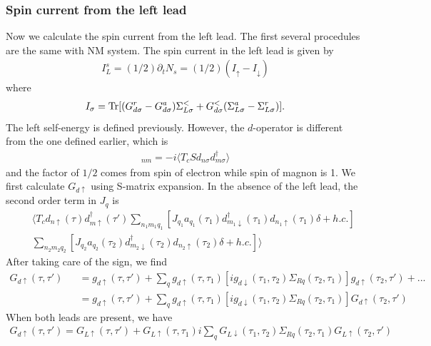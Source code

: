 \documentclass[aps,prb,superscriptaddress]{revtex4-2}
\begin{document}
\subsubsection{Spin current from the left lead}
Now we calculate the spin current from the left lead. The first several procedules are the same with NM system. The spin current in the left lead is given by
\begin{eqnarray}
I_L^s = (1/2) \partial_t N_s = (1/2)(I_{\uparrow}-I_{\downarrow}) \nonumber
\end{eqnarray}
where
\begin{eqnarray}
I_\sigma = {\rm Tr} [(G_{d\sigma}^r-G_{d\sigma}^a)\Sigma^<_{L\sigma} +G_{d\sigma}^< (\Sigma_{L\sigma}^a -\Sigma_{L\sigma}^r)]. \nonumber
\end{eqnarray}
The left self-energy is defined previously. However, the $d$-operator is different from the one defined earlier, which is
\begin{eqnarray}
[G_{d\sigma}]_{nm} = -i\langle T_c S d_{n\sigma} d^\dagger_{m\sigma}\rangle \nonumber
\end{eqnarray}
and the factor of $1/2$ comes from spin of electron while spin of magnon is 1. We first calculate $G_{d\uparrow}$ using S-matrix expansion. In the absence of the left lead, the second order term in $J_q$ is
\begin{eqnarray}
&&\langle T_c d_{n\uparrow}(\tau) d^{\dagger}_{m\uparrow}(\tau') \sum_{n_1 m_1 q_1}[J_{q_1} a_{q_1}(\tau_1) d^{\dagger}_{m_1\downarrow}(\tau_1) d_{n_1\uparrow}(\tau_1)\delta +h.c.]\nonumber \\
&&\sum_{n_2 m_2 q_2}[J_{q_2} a_{q_2}(\tau_2) d^{\dagger}_{m_2\downarrow}(\tau_2) d_{n_2\uparrow}(\tau_2)\delta +h.c.]\rangle \nonumber
\end{eqnarray}
After taking care of the sign, we find
\begin{eqnarray}
G_{d\uparrow}(\tau,\tau') &&= g_{d\uparrow}(\tau,\tau') + \sum_q  g_{d\uparrow}(\tau,\tau_1) [ig_{d\downarrow}(\tau_1,\tau_2)\Sigma_{Rq}(\tau_2,\tau_1)] g_{d\uparrow}(\tau_2,\tau') +... \nonumber \\
&&=g_{d\uparrow}(\tau,\tau') +\sum_q  g_{d\uparrow}(\tau,\tau_1) [ig_{d\downarrow}(\tau_1,\tau_2)\Sigma_{Rq}(\tau_2,\tau_1)] G_{d\uparrow}(\tau_2,\tau') \nonumber
\end{eqnarray}
When both leads are present, we have
\begin{eqnarray}
G_{d\uparrow}(\tau,\tau') =G_{L\uparrow}(\tau,\tau') + G_{L\uparrow}(\tau,\tau_1) i\sum_q G_{L\downarrow}(\tau_1,\tau_2)\Sigma_{Rq}(\tau_2,\tau_1) G_{L\uparrow}(\tau_2,\tau') \label{relation4}
\end{eqnarray}
\end{document}

